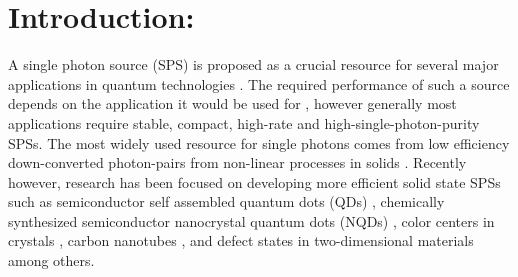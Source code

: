 \documentclass[journal=nalefd,manuscript=letter]{achemso}
\begin{document}
\section{Introduction:}
A single photon source (SPS) is proposed as a crucial resource for several major applications in quantum technologies \cite{Lounis2005,Eisaman2011InvitedDetectors,Aharonovich2016Solid-stateEmitters}.
The required performance of such a source depends on the application it would be used for \cite{Aharonovich2016Solid-stateEmitters}, however generally most applications require stable, compact, high-rate and high-single-photon-purity SPSs. 
The most widely used resource for single photons comes from low efficiency down-converted photon-pairs from non-linear processes in solids \cite{PaulG.Kwiat1995NewPairs,Yan2015GenerationWaveguide,Ngah2015Ultra-fastTechnology,Joshi2018FrequencySources}. 
Recently however, research has been focused on developing more efficient solid state SPSs such as semiconductor self assembled quantum dots (QDs) \cite{Ding2016,Somaschi2016NearState,Schlehahn2016,Daveau2017EfficientWaveguide,Liu2017HighPhotons}, chemically synthesized semiconductor nanocrystal quantum dots (NQDs) \cite{Lounis2000PhotonFluorescence,Michler2000QuantumTemperature,Chen2008GiantBlinking,Bidault2016PicosecondTemperature,Hoang2016UltrafastNanocavities,Matsuzaki2017StrongAntenna},  color centers in crystals \cite{Aharonovich2014DiamondNanophotonics,Schroder2016QuantumInvited,Castelletto2014ASource}, carbon nanotubes \cite{He2017TunableNanotubes,Ishii2017Room-TemperatureNanotubes}, and defect states in two-dimensional materials \cite{Chakraborty2015Voltage-controlledSemiconductor,Grosso2017TunableNitride} among others. 
\end{document}
